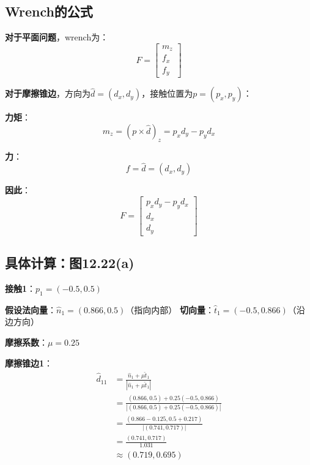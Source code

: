 \documentclass[12pt,a4paper]{article}
\begin{document}
\subsection{Wrench的公式}

\textbf{对于平面问题}，wrench为：
\begin{equation}
F = \begin{bmatrix} m_z \\ f_x \\ f_y \end{bmatrix}
\end{equation}

\textbf{对于摩擦锥边}，方向为$\hat{d} = (d_x, d_y)$，接触位置为$p = (p_x, p_y)$：

\textbf{力矩}：
\begin{equation}
m_z = (p \times \hat{d})_z = p_x d_y - p_y d_x
\end{equation}

\textbf{力}：
\begin{equation}
f = \hat{d} = (d_x, d_y)
\end{equation}

\textbf{因此}：
\begin{equation}
F = \begin{bmatrix} p_x d_y - p_y d_x \\ d_x \\ d_y \end{bmatrix}
\end{equation}

\subsection{具体计算：图12.22(a)}

\textbf{接触1}：$p_1 = (-0.5, 0.5)$

\textbf{假设法向量}：$\hat{n}_1 = (0.866, 0.5)$（指向内部）
\textbf{切向量}：$\hat{t}_1 = (-0.5, 0.866)$（沿边方向）

\textbf{摩擦系数}：$\mu = 0.25$

\textbf{摩擦锥边1}：
\begin{align}
\hat{d}_{11} &= \frac{\hat{n}_1 + \mu \hat{t}_1}{|\hat{n}_1 + \mu \hat{t}_1|} \\
&= \frac{(0.866, 0.5) + 0.25(-0.5, 0.866)}{|(0.866, 0.5) + 0.25(-0.5, 0.866)|} \\
&= \frac{(0.866 - 0.125, 0.5 + 0.217)}{|(0.741, 0.717)|} \\
&= \frac{(0.741, 0.717)}{1.031} \\
&\approx (0.719, 0.695)
\end{align}
\end{document}
